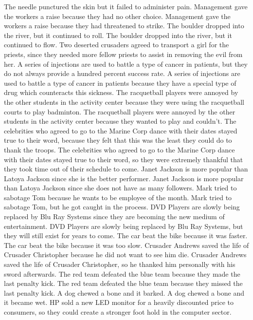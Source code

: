 \documentclass{article}
\begin{document}
\begin{enumerate}
	The needle punctured the skin but it failed to administer pain.
	Management gave the workers a raise because they had no other choice.
	Management gave the workers a raise because they had threatened to strike.
	The boulder dropped into the river, but it continued to roll.
	The boulder dropped into the river, but it continued to flow.
	Two deserted crusaders agreed to transport a girl for the priests, since they needed more fellow priests to assist in removing the evil from her.
	A series of injections are used to battle a type of cancer in patients, but they do not always provide a hundred percent success rate.
	A series of injections are used to battle a type of cancer in patients because they have a special type of drug which counteracts this sickness.
	The racquetball players were annoyed by the other students in the activity center because they were using the racquetball courts to play badminton.
	The racquetball players were annoyed by the other students in the activity center because they wanted to play and couldn't.
	The celebrities who agreed to go to the Marine Corp dance with their dates stayed true to their word, because they felt that this was the least they could do to thank the troops.
	The celebrities who agreed to go to the Marine Corp dance with their dates stayed true to their word, so they were extremely thankful that they took time out of their schedule to come.
	Janet Jackson is more popular than Latoya Jackson since she is the better performer.
	Janet Jackson is more popular than Latoya Jackson since she does not have as many followers.
	Mark tried to sabotage Tom because he wants to be employee of the month.
	Mark tried to sabotage Tom, but he got caught in the process.
	DVD Players are slowly being replaced by Blu Ray Systems since they are becoming the new medium of entertainment.
	DVD Players are slowly being replaced by Blu Ray Systems, but they will still exist for years to come.
	The car beat the bike because it was faster.
	The car beat the bike because it was too slow.
	Crusader Andrews saved the life of Crusader Christopher because he did not want to see him die.
	Crusader Andrews saved the life of Crusader Christopher, so he thanked him personally with his sword afterwards.
	The red team defeated the blue team because they made the last penalty kick.
	The red team defeated the blue team because they missed the last penalty kick.
	A dog chewed a bone and it barked.
	A dog chewed a bone and it became wet.
	HP sold a new LED monitor for a heavily discounted price to consumers, so they could create a stronger foot hold in the computer sector.

\end{enumerate}
\end{document}
